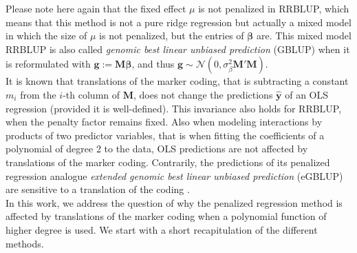 \documentclass{bmcart}
\newcommand{\M}{\mathbf{M}}
\newcommand{\0}{\mathbf{0}}
\newcommand{\y}{\mathbf{y}}
\begin{document}
Please note here again that the fixed effect $\mu$ is not penalized in RRBLUP, which means that this method is not a pure ridge regression but actually a mixed model in which the size of $\mu$ is not penalized, but the entries of $\bm{\beta}$ are.  
This mixed model RRBLUP is also called \emph{genomic best linear unbiased prediction} (GBLUP) when it is reformulated with $\mathbf{g}:=\M \bm{\beta}$, and thus $\mathbf{g}\sim \mathcal{N}(0,\sigma_\beta^2 \M' \M)$. \\

It is known that translations of the marker coding, that is subtracting a constant $m_i$ from the $i$-th column of $\M$, does not change the predictions $\hat{\y}$ of an  OLS regression (provided it is well-defined). This invariance also holds for RRBLUP, when the penalty factor remains fixed. Also when modeling interactions by products of two predictor variables, that is when fitting the coefficients of a polynomial of degree 2 to the data, OLS predictions are not affected by translations of the marker coding. Contrarily, the predictions of its penalized regression analogue \emph{extended genomic best linear unbiased prediction} (eGBLUP) are sensitive to a translation of the coding \cite{he2016does,Martini17}.\\

In this work, we address the question of why the penalized regression method is affected by translations of the marker coding when a polynomial function of higher degree is used. 
We  start with a short recapitulation of the different methods.
\end{document}
